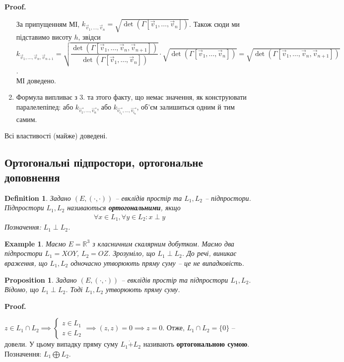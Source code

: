 \documentclass[a4paper, 10pt]{article}
\makeatletter
\theoremstyle{theoremdd}
\newtheorem{definition}[theorem]{Definition}
\newtheorem{example}[theorem]{Example}
\newtheorem{proposition}[theorem]{Proposition}
\renewenvironment{proof}[1][Proof.\\]{\par
\pushQED{\hfill \qed}%
\normalfont \topsep6\p@\@plus6\p@\relax
\trivlist
\item\relax
{\bfseries
#1\@addpunct{.}}\hspace\labelsep\ignorespaces
}{%
\popQED\endtrivlist\@endpefalse
}
\makeatother
\begin{document}
\begin{proof}
\begin{enumerate}[wide=0pt, label={\arabic*)},topsep=-\parskip]
За припущенням МІ, $k_{\vec{v}_1,\dots,\vec{v}_n} = \sqrt{\det(\Gamma[\vec{v}_1,\dots,\vec{v}_n])}$. Також сюди ми підставимо висоту $h$, звідси\\
$k_{\vec{v}_1,\dots,\vec{v}_n,\vec{v}_{n+1}} = \sqrt{\dfrac{\det(\Gamma[\vec{v}_1,\dots,\vec{v}_n,\vec{v}_{n+1}])}{\det(\Gamma[\vec{v}_1,\dots,\vec{v}_n])}} \cdot \sqrt{\det(\Gamma[\vec{v}_1,\dots,\vec{v}_n])} = \sqrt{\det(\Gamma[\vec{v}_1,\dots,\vec{v}_n, \vec{v}_{n+1}])}$.\\
МІ доведено.
\item Формула випливає з 3. та зтого факту, що немає значення, як конструювати паралелепіпед: або $k_{\vec{v_1},\dots,\vec{v_n}}$, або $k_{\vec{v_{i_1}},\dots,\vec{v_{i_n}}}$, об'єм залишиться одним й тим самим.\\
\end{enumerate}
Всі властивості (майже) доведені.
\end{proof}

\subsection{Ортогональні підпростори, ортогональне доповнення}
\begin{definition}
Задано $(E, (\cdot,\cdot))$ -- евклідів простір та $L_1,L_2$ -- підпростори.\\
Підпростори $L_1,L_2$ називаються \textbf{ортогональними}, якщо
\begin{align*}
\forall x \in L_1, \forall y \in L_2: x \perp y
\end{align*}
Позначення: $L_1 \perp L_2$.
\end{definition}

\begin{example}
Маємо $E = \mathbb{R}^3$  з класничним скалярним добутком. Маємо два підпростори $L_1 = XOY$, $L_2 = OZ$. Зрозуміло, що $L_1 \perp L_2$. До речі, виникає враження, що $L_1,L_2$ одночасно утворюють пряму суму -- це не випадковість.
\end{example}

\begin{proposition}
Задано $(E,(\cdot,\cdot))$ -- евклідів простір та підпростори $L_1,L_2$. Відомо, що $L_1 \perp L_2$. Тоді $L_1, L_2$ утворюють пряму суму.
\end{proposition}

\begin{proof}
$z \in L_1 \cap L_2 \implies \begin{cases} z \in L_1 \\ z \in L_2 \end{cases} \implies (z,z) = 0 \implies z = 0$. Отже, $L_1 \cap L_2 = \{0\}$ -- довели.
\end{proof}
\noindent
У цьому випадку пряму суму $L_1 \dot{+} L_2$ називають \textbf{ортогональною сумою}.\\
Позначення: $L_1 \bigoplus L_2$.
\end{document}
